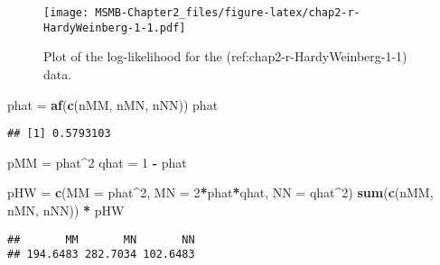 \documentclass[]{article}
\newenvironment{Shaded}{\begin{snugshade}}{\end{snugshade}}
\newcommand{\KeywordTok}[1]{\textcolor[rgb]{0.13,0.29,0.53}{\textbf{#1}}}
\newcommand{\DataTypeTok}[1]{\textcolor[rgb]{0.13,0.29,0.53}{#1}}
\newcommand{\DecValTok}[1]{\textcolor[rgb]{0.00,0.00,0.81}{#1}}
\newcommand{\StringTok}[1]{\textcolor[rgb]{0.31,0.60,0.02}{#1}}
\newcommand{\OperatorTok}[1]{\textcolor[rgb]{0.81,0.36,0.00}{\textbf{#1}}}
\newcommand{\NormalTok}[1]{#1}
\begin{document}
\begin{figure}
\centering
\texttt{[image: MSMB-Chapter2\_files/figure-latex/chap2-r-HardyWeinberg-1-1.pdf]}
\caption{Plot of the log-likelihood for the
(ref:chap2-r-HardyWeinberg-1-1) data.}
\end{figure}

\begin{Shaded}
\begin{Highlighting}[]
\NormalTok{phat  =}\StringTok{  }\KeywordTok{af}\NormalTok{(}\KeywordTok{c}\NormalTok{(nMM, nMN, nNN))}
\NormalTok{phat}
\end{Highlighting}
\end{Shaded}

\begin{verbatim}
## [1] 0.5793103
\end{verbatim}

\begin{Shaded}
\begin{Highlighting}[]
\NormalTok{pMM   =}\StringTok{  }\NormalTok{phat}\OperatorTok{^}\DecValTok{2}
\NormalTok{qhat  =}\StringTok{  }\DecValTok{1} \OperatorTok{-}\StringTok{ }\NormalTok{phat}
\end{Highlighting}
\end{Shaded}

\begin{Shaded}
\begin{Highlighting}[]
\NormalTok{pHW =}\StringTok{ }\KeywordTok{c}\NormalTok{(}\DataTypeTok{MM =}\NormalTok{ phat}\OperatorTok{^}\DecValTok{2}\NormalTok{, }\DataTypeTok{MN =} \DecValTok{2}\OperatorTok{*}\NormalTok{phat}\OperatorTok{*}\NormalTok{qhat, }\DataTypeTok{NN =}\NormalTok{ qhat}\OperatorTok{^}\DecValTok{2}\NormalTok{)}
\KeywordTok{sum}\NormalTok{(}\KeywordTok{c}\NormalTok{(nMM, nMN, nNN)) }\OperatorTok{*}\StringTok{ }\NormalTok{pHW}
\end{Highlighting}
\end{Shaded}

\begin{verbatim}
##       MM       MN       NN 
## 194.6483 282.7034 102.6483
\end{verbatim}
\end{document}
